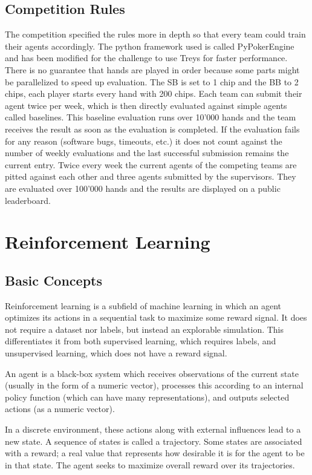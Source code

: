 \subsection{Competition Rules}
The competition specified the rules more in depth so that every team could train their agents accordingly. The python framework used is called PyPokerEngine \cite{Pypokerengine} and has been modified for the challenge to use Treys \cite{Treys} for faster performance. There is no guarantee that hands are played in order because some parts might be parallelized to speed up evaluation. The SB is set to 1 chip and the BB to 2 chips, each player starts every hand with 200 chips. Each team can submit their agent twice per week, which is then directly evaluated against simple agents called baselines. This baseline evaluation runs over 10'000 hands and the team receives the result as soon as the evaluation is completed. If the evaluation fails for any reason (software bugs, timeouts, etc.) it does not count against the number of weekly evaluations and the last successful submission remains the current entry. Twice every week the current agents of the competing teams are pitted against each other and three agents submitted by the supervisors. They are evaluated over 100'000 hands and the results are displayed on a public leaderboard.

\section{Reinforcement Learning}
\label{ReinforcementLearningChapter}
\subsection{Basic Concepts}
Reinforcement learning is a subfield of machine learning in which an agent optimizes its actions in a sequential task to maximize some reward signal. It does not require a dataset nor labels, but instead an explorable simulation. This differentiates it from both supervised learning, which requires labels, and unsupervised learning, which does not have a reward signal.

An agent is a black-box system which receives observations of the current state (usually in the form of a numeric vector), processes this according to an internal policy function (which can have many representations), and outputs selected actions (as a numeric vector).

In a discrete environment, these actions along with external influences lead to a new state. A sequence of states is called a trajectory. Some states are associated with a reward; a real value that represents how desirable it is for the agent to be in that state. The agent seeks to maximize overall reward over its trajectories.

